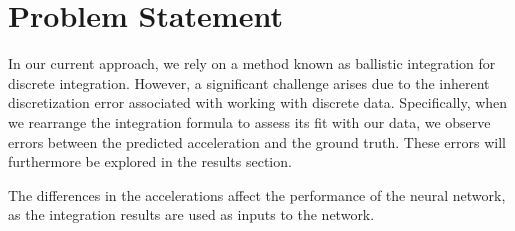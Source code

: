 \section{Problem Statement}
In our current approach, we rely on a method known as ballistic integration for discrete integration. 
However, a significant challenge arises due to the inherent discretization error associated 
with working with discrete data.
Specifically, when we rearrange the integration formula to assess its fit with our data, 
we observe errors between the predicted acceleration and the ground truth.
These errors will furthermore be explored in the results section.

The differences in the accelerations affect the performance of the neural network, 
as the integration results are used as inputs to the network.


